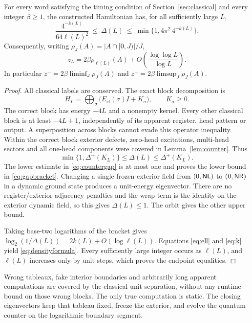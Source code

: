 \begin{theorem}\label{thm:realization}
For every word satisfying the timing condition of
Section~\ref{sec:classical} and every integer $\beta\geq1$, the constructed
Hamiltonian has, for all sufficiently large $L$,
\begin{equation}\label{eq:gapbracket}
 \frac{4^{-k(L)}}{64\ell(L)^2}\ \leq\ \Delta(L)
 \ \leq\ \min\{1,4\pi^2\,4^{-k(L)}\}.
\end{equation}
Consequently, writing $\rho_J(A)=|A\cap[0,J)|/J$,
\begin{equation}\label{eq:densityformula}
 z_L=2\beta\rho_{\ell(L)}(A)
      +O\!\left(\frac{\log\log L}{\log L}\right).
\end{equation}
In particular $z^-=2\beta\liminf_J\rho_J(A)$ and
$z^+=2\beta\limsup_J\rho_J(A)$.
\end{theorem}
\begin{proof}
All classical labels are conserved. The exact block decomposition is
\begin{equation}\label{eq:blocks}
 H_L=\bigoplus_\sigma\bigl(E_{\mathrm{cl}}(\sigma)I+K_\sigma\bigr),
 \qquad K_\sigma\geq0.
\end{equation}
The correct block has energy $-4L$ and a nonempty kernel. Every other
classical block is at least $-4L+1$, independently of its apparent
register, head pattern or output. A superposition across blocks cannot
evade this operator inequality. Within the correct block exterior defects,
zero-head excitations, multi-head sectors and all one-head components were
covered in Lemma~\ref{lem:counter}. Thus
\[
 \min\{1,\Delta^+(K_L)\}\leq\Delta(L)\leq\Delta^+(K_L).
\]
The lower estimate in \eqref{eq:countergap} is at most one and proves the
lower bound in \eqref{eq:gapbracket}. Changing a single frozen exterior
field from $(0,\mathsf{NL})$ to $(0,\mathsf{NR})$ in a dynamic ground state produces a
unit-energy eigenvector. There are no register/exterior adjacency
penalties and the wrap term is the identity on the exterior dynamic
field, so this gives $\Delta(L)\leq1$. The orbit gives the other upper
bound.

Taking base-two logarithms of the bracket gives
$\log_2(1/\Delta(L))=2k(L)+O(\log\ell(L))$. Equations
\eqref{eq:ell} and \eqref{eq:k} yield \eqref{eq:densityformula}.
Every sufficiently large integer occurs as $\ell(L)$, and $\ell(L)$
increases only by unit steps, which proves the endpoint equalities.
\end{proof}

Wrong tableaux, fake interior boundaries and arbitrarily long apparent
computations are covered by the classical unit separation, without any
runtime bound on those wrong blocks. The only true computation is static.
The closing eigenvectors keep that tableau fixed, freeze the exterior,
and evolve the quantum counter on the logarithmic boundary segment.

